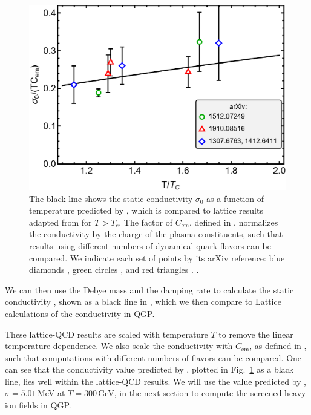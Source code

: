 \begin{figure}[ht]
    \centering
    \includegraphics[width=0.85\linewidth]{plots/chap02QCD/condcomp.png}
    \caption{The black line shows the static conductivity $\sigma_0$ as a function of temperature predicted by , which is compared to lattice results adapted from \cite{Aarts:2020dda} for $T>T_c$. The factor of $C_{\text{em}}$, defined in , normalizes the conductivity by the charge of the plasma constituents, such that results using different numbers of dynamical quark flavors can be compared. We indicate each set of points by its arXiv reference: blue diamonds \cite{Amato:2013naa,Aarts:2014nba}, green circles \cite{Brandt:2015aqk}, and red triangles \cite{Astrakhantsev:2019zkr}. .}
    \label{fig:lattice comp}
\end{figure}

We can then use the Debye mass  and the damping rate  to calculate the static conductivity , shown as a black line in , which we then compare to Lattice calculations of the conductivity in QGP.

These lattice-QCD results \cite{Amato:2013naa,Aarts:2014nba,Brandt:2015aqk,Astrakhantsev:2019zkr} are scaled with temperature $T$ to remove the linear temperature dependence. We also scale the conductivity with $C_{\text{em}}$, as defined in , such that computations with different numbers of flavors can be compared. One can see that the conductivity value predicted by , plotted in Fig.~\ref{fig:lattice comp} as a black line, lies well within the lattice-QCD results. We will use the value predicted by , $\sigma = 5.01\,$MeV at $T=300\,$GeV, in the next section to compute the screened heavy ion fields in QGP.

